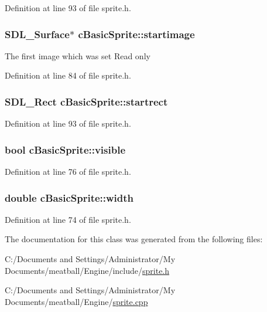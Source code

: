 Definition at line 93 of file sprite.\-h.

\hypertarget{classc_basic_sprite_abbe64a52b3e23c03246631e63382d1d5}{
\subsubsection[{startimage}]{\setlength{\rightskip}{0pt plus 5cm}S\-D\-L\-\_\-\-Surface$\ast$ c\-Basic\-Sprite\-::startimage}}\label{classc_basic_sprite_abbe64a52b3e23c03246631e63382d1d5}
The first image which was set Read only 

Definition at line 84 of file sprite.\-h.

\hypertarget{classc_basic_sprite_ad29c8fafc2c544c30cf028a58e93d063}{
\subsubsection[{startrect}]{\setlength{\rightskip}{0pt plus 5cm}S\-D\-L\-\_\-\-Rect c\-Basic\-Sprite\-::startrect}}\label{classc_basic_sprite_ad29c8fafc2c544c30cf028a58e93d063}


Definition at line 93 of file sprite.\-h.

\hypertarget{classc_basic_sprite_a1af0eebcb86cb160a384fb8acea2d773}{
\subsubsection[{visible}]{\setlength{\rightskip}{0pt plus 5cm}bool c\-Basic\-Sprite\-::visible}}\label{classc_basic_sprite_a1af0eebcb86cb160a384fb8acea2d773}


Definition at line 76 of file sprite.\-h.

\hypertarget{classc_basic_sprite_a99d40d0360fb5a3791c62240d65b677c}{
\subsubsection[{width}]{\setlength{\rightskip}{0pt plus 5cm}double c\-Basic\-Sprite\-::width}}\label{classc_basic_sprite_a99d40d0360fb5a3791c62240d65b677c}


Definition at line 74 of file sprite.\-h.



The documentation for this class was generated from the following files\-:\begin{DoxyCompactItemize}
\item 
C\-:/\-Documents and Settings/\-Administrator/\-My Documents/meatball/\-Engine/include/\hyperlink{sprite_8h}{sprite.\-h}\item 
C\-:/\-Documents and Settings/\-Administrator/\-My Documents/meatball/\-Engine/\hyperlink{sprite_8cpp}{sprite.\-cpp}\end{DoxyCompactItemize}
